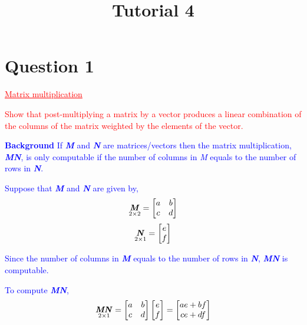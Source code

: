 \documentclass[12pt]{report}
\title{Tutorial 4}
\subtitle
{
	\textbf{keywords}: matrix, matrices, vector, column space, histogram, scatter plot, mean, standard deviation, regression, simple, conditional expectation, OLS estimator, prediction, R squared, residual, interpretation, intercept, slope 
	
	\textbf{estimated reading time}: 35 minutes
}
\newenvironment{blueframed}[1][blue]
{\def\FrameCommand{\fboxsep=\FrameSep\fcolorbox{#1}{white}}%
\MakeFramed {\advance\hsize-\width \FrameRestore}}
{\endMakeFramed}
\begin{document}
	
\maketitle

\section*{Question 1}
\textcolor{red}{\underline{Matrix multiplication}}

\noindent \textcolor{red}{Show that post-multiplying a matrix by a vector produces a linear combination of the columns of the matrix weighted by the elements of the vector.}

\justify
\begin{blueframed}
\textcolor{blue}{\textbf{Background}}
\vspace{-\baselineskip}
\justify
\textcolor{blue}{If \textbf{\textit{M}} and \textbf{\textit{N}} are matrices/vectors then the matrix multiplication, \textbf{\textit{MN}}, is only computable if the number of columns in \textit{M} equals to the number of rows in \textbf{\textit{N}}.}

\noindent \textcolor{blue}{Suppose that \textbf{\textit{M}} and \textbf{\textit{N}} are given by,}
\textcolor{blue}
	{$$\underset{2\times2}{\textbf{\textit{M}}}
		=
		\begin{bmatrix}
			a & b \\
			c & d 
		\end{bmatrix}
	$$}
\textcolor{blue}
	{$$\underset{2\times1}{\textbf{\textit{N}}}
		=
		\begin{bmatrix}
			e \\
			f  
	\end{bmatrix}
	$$}

\noindent \textcolor{blue}{Since the number of columns in \textbf{\textit{M}} equals to the number of rows in \textbf{\textit{N}}, \textbf{\textit{MN}} is computable.}

\noindent \textcolor{blue}{To compute \textbf{\textit{MN}},}
\textcolor{blue}
{$$\underset{2\times1}{\textbf{\textit{MN}}}
	=
	\begin{bmatrix}
	a & b \\
	c & d 
	\end{bmatrix}
	\begin{bmatrix}
	e \\
	f 
	\end{bmatrix}
	=
	\begin{bmatrix}
	ae+bf \\
	ce+df
	\end{bmatrix}
$$}
\end{blueframed}
\end{document}
